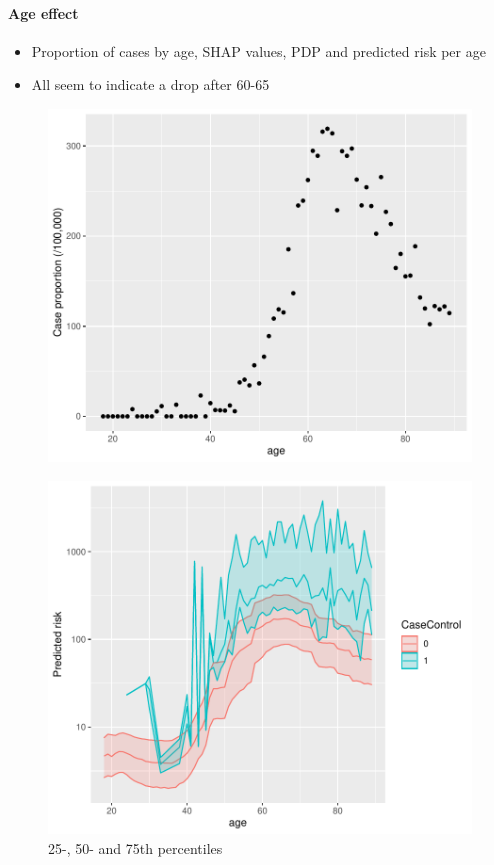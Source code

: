 \documentclass[12pt]{article}
\begin{document}
  
 
\clearpage
\paragraph*{Age effect}

\begin{itemize}
	\item Proportion of cases by age, SHAP values, PDP and predicted risk per age
	\item All seem to indicate a drop after 60-65
\end{itemize}

\begin{figure}[h]
\centering
\includegraphics[width=\textwidth]{figures/cond_prop_age.pdf}
\end{figure}

\begin{figure}[h]
\centering
\includegraphics[width=\textwidth]{figures/risk_age.pdf}
\caption{25-, 50- and 75th percentiles}
\end{figure}
\end{document}
